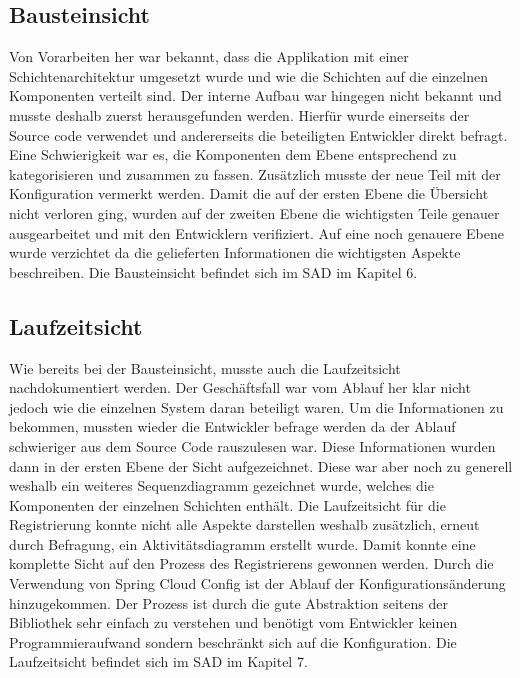 \subsection{Bausteinsicht}

Von Vorarbeiten her war bekannt, dass die Applikation mit einer Schichtenarchitektur umgesetzt wurde und wie die Schichten auf die einzelnen Komponenten verteilt sind. Der interne Aufbau war hingegen nicht bekannt und musste deshalb zuerst herausgefunden werden. Hierfür wurde einerseits der Source code verwendet und andererseits die beteiligten Entwickler direkt befragt. Eine Schwierigkeit war es, die Komponenten dem Ebene entsprechend zu kategorisieren und zusammen zu fassen. Zusätzlich musste der neue Teil mit der Konfiguration vermerkt werden. Damit die auf der ersten Ebene die Übersicht nicht verloren ging, wurden auf der zweiten Ebene die wichtigsten Teile genauer ausgearbeitet und mit den Entwicklern verifiziert. Auf eine noch genauere Ebene wurde verzichtet da die gelieferten Informationen die wichtigsten Aspekte beschreiben. Die Bausteinsicht befindet sich im SAD im Kapitel 6.

\subsection{Laufzeitsicht}

Wie bereits bei der Bausteinsicht, musste auch die Laufzeitsicht nachdokumentiert werden. Der Geschäftsfall war vom Ablauf her klar nicht jedoch wie die einzelnen System daran beteiligt waren. Um die Informationen zu bekommen, mussten wieder die Entwickler befrage werden da der Ablauf schwieriger aus dem Source Code rauszulesen war. Diese Informationen wurden dann in der ersten Ebene der Sicht aufgezeichnet. Diese war aber noch zu generell weshalb ein weiteres Sequenzdiagramm gezeichnet wurde, welches die Komponenten der einzelnen Schichten enthält. Die Laufzeitsicht für die Registrierung konnte nicht alle Aspekte darstellen weshalb zusätzlich, erneut durch Befragung, ein Aktivitätsdiagramm erstellt wurde. Damit konnte eine komplette Sicht auf den Prozess des Registrierens gewonnen werden.\newline\newline
Durch die Verwendung von Spring Cloud Config ist der Ablauf der Konfigurationsänderung hinzugekommen. Der Prozess ist durch die gute Abstraktion seitens der Bibliothek sehr einfach zu verstehen und benötigt vom Entwickler keinen Programmieraufwand sondern beschränkt sich auf die Konfiguration. Die Laufzeitsicht befindet sich im SAD im Kapitel 7.


